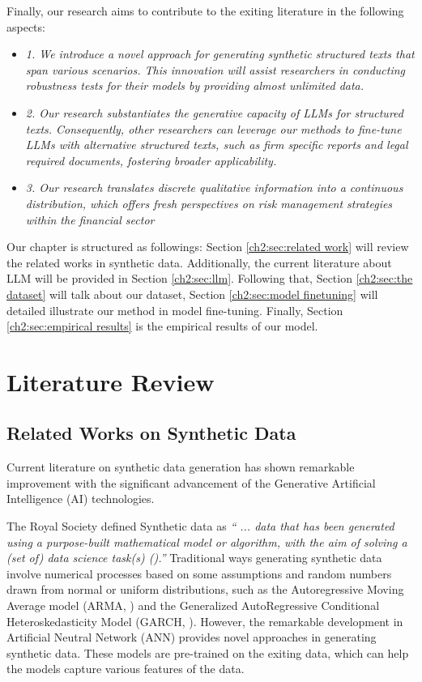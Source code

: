 Finally, our research aims to contribute to the exiting literature in the following aspects:
\begin{itemize}
    \item \textit{1. We introduce a novel approach for generating synthetic structured texts that span various scenarios. This innovation will assist researchers in conducting robustness tests for their models by providing almost unlimited data.}
    \item \textit{2. Our research substantiates the generative capacity of LLMs for structured texts. Consequently, other researchers can leverage our methods to fine-tune LLMs with alternative structured texts, such as firm specific reports and legal required documents, fostering broader applicability.}
    \item \textit{3. Our research translates discrete qualitative information into a continuous distribution, which offers fresh perspectives on risk management strategies within the financial sector}
\end{itemize}


Our chapter is structured as followings: Section \ref{ch2:sec:related work} will review the related works in synthetic data. Additionally, the current literature about LLM will be provided in Section \ref{ch2:sec:llm}. Following that, Section \ref{ch2:sec:the dataset} will talk about our dataset, Section \ref{ch2:sec:model finetuning} will detailed illustrate our method in model fine-tuning. Finally, Section \ref{ch2:sec:empirical results} is the empirical results of our model. 



\section{Literature Review}\label{ch2:sec:lr}

\subsection{Related Works on Synthetic Data}\label{ch2:sec:lr:related work}
Current literature on synthetic data generation has shown remarkable improvement with the significant advancement of the Generative Artificial Intelligence (AI) technologies. 

The Royal Society defined Synthetic data as \textit{`` ... data that has been generated using a purpose-built mathematical model or algorithm, with the aim of solving a (set of) data science task(s) (\cite{jordon2022synthetic}).''}  Traditional ways generating synthetic data involve numerical processes based on some assumptions and random numbers drawn from normal or uniform distributions, such as the Autoregressive Moving Average model (ARMA, \cite{whittle1951hypothesis}) and the Generalized AutoRegressive Conditional Heteroskedasticity Model (GARCH, \cite{Bollerslev:1986}). However, the remarkable development in Artificial Neutral Network (ANN) provides novel approaches in generating synthetic data. These models are pre-trained on the exiting data, which can help the models capture various features of the data. 

